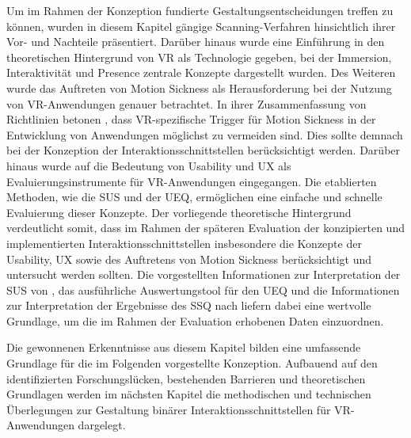 Um im Rahmen der Konzeption fundierte Gestaltungsentscheidungen treffen zu können, wurden in diesem Kapitel gängige Scanning-Verfahren hinsichtlich ihrer Vor- und Nachteile präsentiert. Darüber hinaus wurde eine Einführung in den theoretischen Hintergrund von VR als Technologie gegeben, bei der Immersion, Interaktivität und Presence zentrale Konzepte dargestellt wurden. Des Weiteren wurde das Auftreten von Motion Sickness als Herausforderung bei der Nutzung von VR-Anwendungen genauer betrachtet. In ihrer Zusammenfassung von Richtlinien betonen \citet{heilemann_accessibility_2021}, dass VR-spezifische Trigger für Motion Sickness in der Entwicklung von Anwendungen möglichst zu vermeiden sind. Dies sollte demnach bei der Konzeption der Interaktionsschnittstellen berücksichtigt werden. Darüber hinaus wurde auf die Bedeutung von Usability und UX als Evaluierungsinstrumente für VR-Anwendungen eingegangen. Die etablierten Methoden, wie die SUS und der UEQ, ermöglichen eine einfache und schnelle Evaluierung dieser Konzepte. Der vorliegende theoretische Hintergrund verdeutlicht somit, dass im Rahmen der späteren Evaluation der konzipierten und implementierten Interaktionsschnittstellen insbesondere die Konzepte der Usability, UX sowie des Auftretens von Motion Sickness berücksichtigt und untersucht werden sollten. Die vorgestellten Informationen zur Interpretation der SUS von \citet{bangor_empirical_2008}, das ausführliche Auswertungstool für den UEQ und die Informationen zur Interpretation der Ergebnisse des SSQ nach \citet{stanney_cybersickness_1997} liefern dabei eine wertvolle Grundlage, um die im Rahmen der Evaluation erhobenen Daten einzuordnen. 

Die gewonnenen Erkenntnisse aus diesem Kapitel bilden eine umfassende Grundlage für die im Folgenden vorgestellte Konzeption. Aufbauend auf den identifizierten Forschungslücken, bestehenden Barrieren und theoretischen Grundlagen werden im nächsten Kapitel die methodischen und technischen Überlegungen zur Gestaltung binärer Interaktionsschnittstellen für VR-Anwendungen dargelegt.